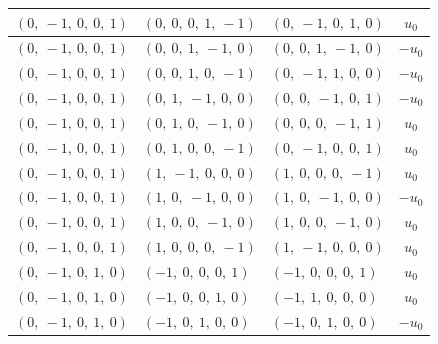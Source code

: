 \documentclass[11pt]{article}
\theoremstyle{definition}
\begin{document}
\begin{longtable}{|l|l|l|c|}
    \hline
    $\left( 0, \  -1, \  0, \  0, \  1\right)$ & $\left( 0, \  0, \  0, \  1, \  -1\right)$ & $\left( 0, \  -1, \  0, \  1, \  0\right)$ & $u_{0}$ \\
    \hline
    $\left( 0, \  -1, \  0, \  0, \  1\right)$ & $\left( 0, \  0, \  1, \  -1, \  0\right)$ & $\left( 0, \  0, \  1, \  -1, \  0\right)$ & $- u_{0}$ \\
    \hline
    $\left( 0, \  -1, \  0, \  0, \  1\right)$ & $\left( 0, \  0, \  1, \  0, \  -1\right)$ & $\left( 0, \  -1, \  1, \  0, \  0\right)$ & $- u_{0}$ \\
    \hline
    $\left( 0, \  -1, \  0, \  0, \  1\right)$ & $\left( 0, \  1, \  -1, \  0, \  0\right)$ & $\left( 0, \  0, \  -1, \  0, \  1\right)$ & $- u_{0}$ \\
    \hline
    $\left( 0, \  -1, \  0, \  0, \  1\right)$ & $\left( 0, \  1, \  0, \  -1, \  0\right)$ & $\left( 0, \  0, \  0, \  -1, \  1\right)$ & $u_{0}$ \\
    \hline
    $\left( 0, \  -1, \  0, \  0, \  1\right)$ & $\left( 0, \  1, \  0, \  0, \  -1\right)$ & $\left( 0, \  -1, \  0, \  0, \  1\right)$ & $u_{0}$ \\
    \hline
    $\left( 0, \  -1, \  0, \  0, \  1\right)$ & $\left( 1, \  -1, \  0, \  0, \  0\right)$ & $\left( 1, \  0, \  0, \  0, \  -1\right)$ & $u_{0}$ \\
    \hline
    $\left( 0, \  -1, \  0, \  0, \  1\right)$ & $\left( 1, \  0, \  -1, \  0, \  0\right)$ & $\left( 1, \  0, \  -1, \  0, \  0\right)$ & $- u_{0}$ \\
    \hline
    $\left( 0, \  -1, \  0, \  0, \  1\right)$ & $\left( 1, \  0, \  0, \  -1, \  0\right)$ & $\left( 1, \  0, \  0, \  -1, \  0\right)$ & $u_{0}$ \\
    \hline
    $\left( 0, \  -1, \  0, \  0, \  1\right)$ & $\left( 1, \  0, \  0, \  0, \  -1\right)$ & $\left( 1, \  -1, \  0, \  0, \  0\right)$ & $u_{0}$ \\
    \hline
    $\left( 0, \  -1, \  0, \  1, \  0\right)$ & $\left( -1, \  0, \  0, \  0, \  1\right)$ & $\left( -1, \  0, \  0, \  0, \  1\right)$ & $u_{0}$ \\
    \hline
    $\left( 0, \  -1, \  0, \  1, \  0\right)$ & $\left( -1, \  0, \  0, \  1, \  0\right)$ & $\left( -1, \  1, \  0, \  0, \  0\right)$ & $u_{0}$ \\
    \hline
    $\left( 0, \  -1, \  0, \  1, \  0\right)$ & $\left( -1, \  0, \  1, \  0, \  0\right)$ & $\left( -1, \  0, \  1, \  0, \  0\right)$ & $- u_{0}$ \\

\end{longtable}
\end{document}

